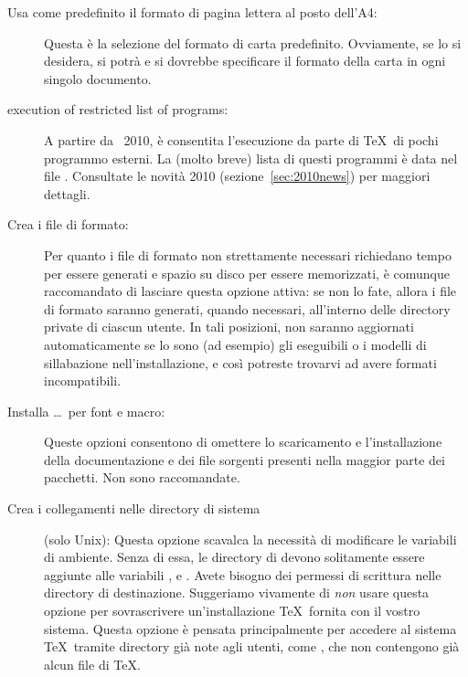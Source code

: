 \documentclass{article}
\begin{document}
\begin{description}
\item[Usa come predefinito il formato di pagina lettera al posto dell'A4:]
  Questa è la selezione del formato di carta predefinito. Ovviamente, se
  lo si desidera, si potrà e si dovrebbe specificare il formato della
  carta in ogni singolo documento.

\item[execution of restricted list of programs:] A partire da \TL\ 2010,
  è consentita l'esecuzione da parte di \TeX\ di pochi programmo esterni.
  La (molto breve) lista di questi programmi è data nel file
  . Consultate le novità 2010
  (sezione~\ref{sec:2010news}) per maggiori dettagli.

\item[Crea i file di formato:] Per quanto i file di formato non
  strettamente necessari richiedano tempo per essere generati e spazio su
  disco per essere memorizzati, è comunque raccomandato di lasciare questa
  opzione attiva: se non lo fate, allora i file di formato saranno
  generati, quando necessari, all'interno delle directory private
   di ciascun utente. In tali posizioni, non saranno
  aggiornati automaticamente se lo sono (ad esempio) gli eseguibili o i
  modelli di sillabazione nell'installazione, e così potreste trovarvi ad
  avere formati incompatibili.

\item[Installa \ldots\ per font e macro:] Queste opzioni consentono di
  omettere lo scaricamento e l'installazione della documentazione e dei
  file sorgenti presenti nella maggior parte dei pacchetti. Non sono
  raccomandate.

\item[Crea i collegamenti nelle directory di sistema] (solo Unix): Questa
  opzione scavalca la necessità di modificare le variabili di ambiente.
  Senza di essa, le directory di \TL{} devono solitamente essere aggiunte
  alle variabili ,  e .
  Avete bisogno dei permessi di scrittura nelle directory di destinazione.
  Suggeriamo vivamente di \emph{non} usare questa opzione per
  sovrascrivere un'installazione \TeX\ fornita con il vostro sistema.
  Questa opzione è pensata principalmente per accedere al sistema \TeX\
  tramite directory già note agli utenti, come ,
  che non contengono già alcun file di \TeX.
\end{description}
\end{document}
